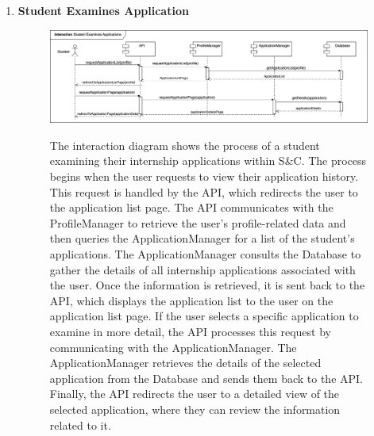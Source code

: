 \begin{enumerate}
    \newpage
    \item \textbf{Student Examines Application}
    \begin{figure}[h!]
            \centering  \includegraphics[width=1\textwidth]{DD/Images/Interactions/INT07_StudentExaminesApplications.drawio.png}
            \label{fig:ComponentViewDiagram}
            \caption*{The interaction diagram shows the process of a student examining their internship applications within S\&C. The process begins when the user requests to view their application history. This request is handled by the API, which redirects the user to the application list page. The API communicates with the ProfileManager to retrieve the user’s profile-related data and then queries the ApplicationManager for a list of the student’s applications.
            The ApplicationManager consults the Database to gather the details of all internship applications associated with the user. Once the information is retrieved, it is sent back to the API, which displays the application list to the user on the application list page.
            If the user selects a specific application to examine in more detail, the API processes this request by communicating with the ApplicationManager. The ApplicationManager retrieves the details of the selected application from the Database and sends them back to the API. Finally, the API redirects the user to a detailed view of the selected application, where they can review the information related to it.}
    \end{figure}


\end{enumerate}
